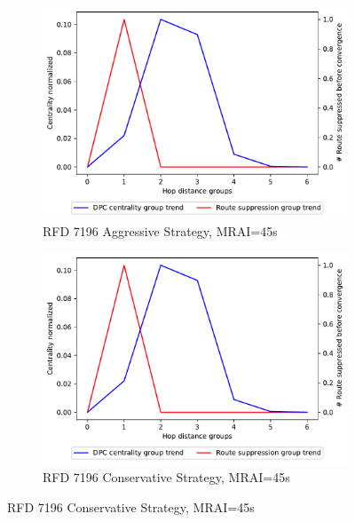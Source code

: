 \begin{figure}[H]
\begin{subfigure}[b]{0.325\textwidth}
         \label{fig:1000_2439RFD_centVSsup_elephants}
     \end{subfigure}
     \hfill
     \begin{subfigure}[b]{0.325\textwidth}
         \centering
         \includegraphics[width=\textwidth]{images/RFD/miceVSelephants/MultiMRAI/45/elephants/cisco_1000_RFD_7196_aggressive_nodeConvergence_centVSsup_trend.pdf}
         \caption{RFD 7196 Aggressive Strategy, MRAI=45s}
         \label{fig:1000_7196RFDA_centVSsup_elephants}
     \end{subfigure}
     \hfill
     \begin{subfigure}[b]{0.325\textwidth}
         \centering
         \includegraphics[width=\textwidth]{images/RFD/miceVSelephants/MultiMRAI/45/elephants/cisco_1000_RFD_7196_conservative_nodeConvergence_centVSsup_trend.pdf}
         \caption{RFD 7196 Conservative Strategy, MRAI=45s}

\end{subfigure}
\end{figure}
